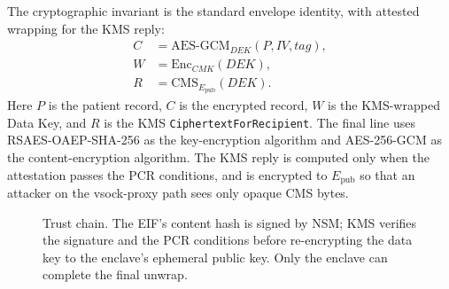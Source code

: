 \documentclass[11pt]{article}
\begin{document}
The cryptographic invariant is the standard envelope identity, with
attested wrapping for the KMS reply:
\begin{align*}
C &= \mathrm{AES\text{-}GCM}_{DEK}(P, IV, tag),\\
W &= \mathrm{Enc}_{CMK}(DEK),\\
R &= \mathrm{CMS}_{E_{\mathrm{pub}}}(DEK).
\end{align*}
Here $P$ is the patient record, $C$ is the encrypted record, $W$ is
the KMS-wrapped Data Key, and $R$ is the KMS
\texttt{CiphertextForRecipient}. The final line uses
RSAES-OAEP-SHA-256 \cite{rfc8017} as the key-encryption algorithm and
AES-256-GCM as the content-encryption algorithm. The KMS reply is
computed only when the attestation passes the PCR conditions, and is
encrypted to $E_{\mathrm{pub}}$ so that an attacker on the
vsock-proxy path sees only opaque CMS bytes.

\begin{figure}[t]
\centering
{}
\caption{Trust chain. The EIF's content hash is signed by NSM; KMS
verifies the signature and the PCR conditions before re-encrypting
the data key to the enclave's ephemeral public key. Only the
enclave can complete the final unwrap.}
\label{fig:trust}
\end{figure}
\end{document}
